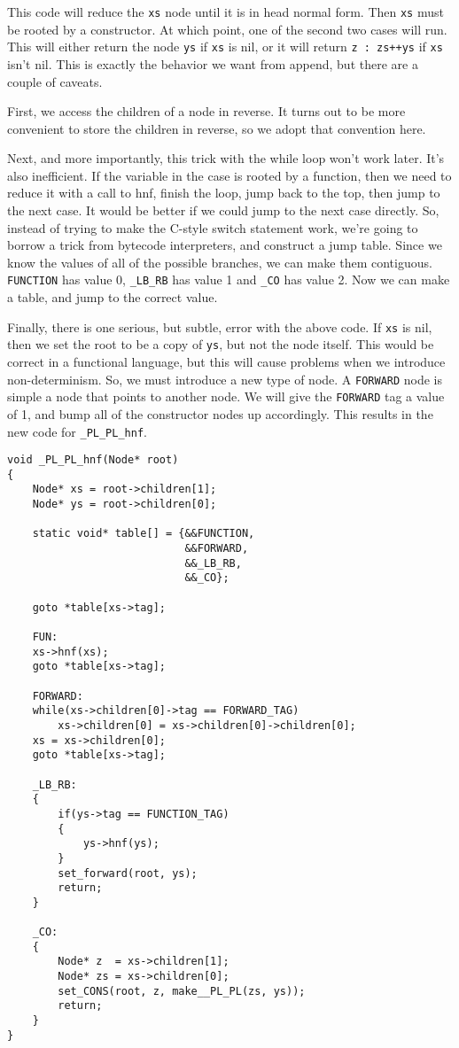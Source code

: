\documentclass{article}
\begin{document}
This code will reduce the \texttt{xs} node until it is in head normal form.
Then \texttt{xs} must be rooted by a constructor.
At which point, one of the second two cases will run.
This will either return the node \texttt{ys} if \texttt{xs} is nil,
or it will return \texttt{z : zs++ys} if \texttt{xs} isn't nil.
This is exactly the behavior we want from append, but there are a couple of caveats.

First, we access the children of a node in reverse.
It turns out to be more convenient to store the children in reverse,
so we adopt that convention here.

Next, and more importantly, this trick with the while loop won't work later.
It's also inefficient.
If the variable in the case is rooted by a function, then we need to reduce it with a call to hnf,
finish the loop, jump back to the top, then jump to the next case.
It would be better if we could jump to the next case directly.
So, instead of trying to make the C-style switch statement work,
we're going to borrow a trick from bytecode interpreters, and construct a jump table.
Since we know the values of all of the possible branches, we can make them contiguous.
\texttt{FUNCTION} has value 0, \texttt{\_LB\_RB} has value 1 and \texttt{\_CO} has value 2.
Now we can make a table, and jump to the correct value.

Finally, there is one serious, but subtle, error with the above code.
If \texttt{xs} is nil, then we set the root to be a copy of \texttt{ys},
but not the node itself.
This would be correct in a functional language, 
but this will cause problems when we introduce non-determinism.
So, we must introduce a new type of node.
A \texttt{FORWARD} node is simple a node that points to another node.
We will give the \texttt{FORWARD} tag a value of 1, and bump all of the constructor nodes up accordingly.
This results in the new code for \texttt{\_PL\_PL\_hnf}.

\begin{verbatim}
void _PL_PL_hnf(Node* root)
{
    Node* xs = root->children[1];
    Node* ys = root->children[0];

    static void* table[] = {&&FUNCTION, 
                            &&FORWARD, 
                            &&_LB_RB, 
                            &&_CO};

    goto *table[xs->tag];

    FUN:
    xs->hnf(xs);
    goto *table[xs->tag];

    FORWARD:
    while(xs->children[0]->tag == FORWARD_TAG)
        xs->children[0] = xs->children[0]->children[0];
    xs = xs->children[0];
    goto *table[xs->tag];

    _LB_RB:
    {
        if(ys->tag == FUNCTION_TAG)
        {
            ys->hnf(ys);
        }
        set_forward(root, ys);
        return;
    }

    _CO:
    {
        Node* z  = xs->children[1];
        Node* zs = xs->children[0];
        set_CONS(root, z, make__PL_PL(zs, ys));
        return;
    }
}
\end{verbatim}
\end{document}
